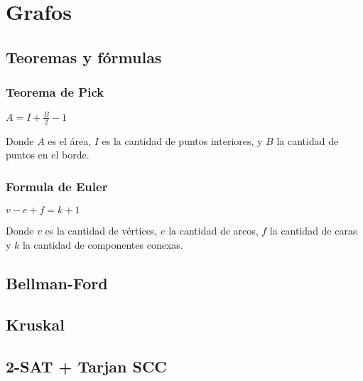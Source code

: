 {\section{Grafos}%
\subsection{Teoremas y fórmulas}
{
\subsubsection{Teorema de Pick}
{
$A=I+\frac{B}{2}-1$

Donde \(A\) es el área, \(I\) es la cantidad de puntos interiores, y \(B\) la cantidad de puntos en el borde.
}

\subsubsection{Formula de Euler}
{
$v-e+f=k+1$

Donde \(v\) es la cantidad de vértices, \(e\) la cantidad de arcos, \(f\) la cantidad de caras y \(k\) la cantidad de componentes conexas.
}
}
\subsection{Bellman-Ford}
\subsection{Kruskal}
\subsection{2-SAT + Tarjan SCC}
}
